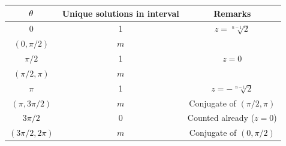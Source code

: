 \begin{solution}
    \begin{table}[H]
        \centering
        \begin{tabular}{|c|c|c|}
        \hline
        $\theta$ & Unique solutions in interval & Remarks \\ \hline\hline
        0 & 1 & $z = \sqrt[n-1]{2}$ \\ \hline
        $(0, \pi/2)$ & $m$ &  \\ \hline
        $\pi/2$ & 1 & $z = 0$ \\ \hline
        $(\pi/2, \pi)$ & $m$ &  \\ \hline
        $\pi$ & 1 & $z = -\sqrt[n-1]{2}$ \\ \hline
        $(\pi, 3\pi/2)$ & $m$ &  Conjugate of $(\pi/2, \pi)$\\ \hline
        $3\pi/2$ & 0 & Counted already ($z = 0$) \\ \hline
        $(3\pi/2, 2\pi)$ & $m$ & Conjugate of $(0, \pi/2)$ \\ \hline
        \end{tabular}
    \end{table}
\end{solution}

